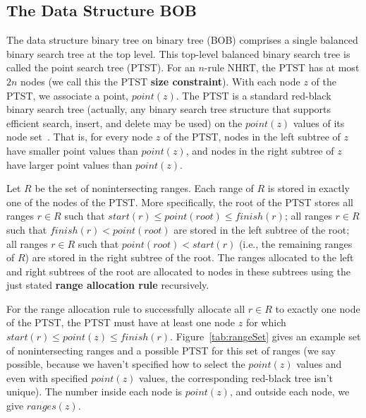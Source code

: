 \subsection{The Data Structure BOB}
The data structure binary tree on binary tree (BOB)
comprises a single balanced binary search tree at the top level.
This top-level balanced binary search tree is called the point search tree
(PTST). For an $n$-rule NHRT, the PTST has at most $2n$ nodes (we call this
the PTST {\bf size constraint}).
With each node $z$ of the PTST, we associate a point, $point(z)$.
The PTST is a standard red-black binary search tree (actually, any
binary search tree structure that supports efficient search, insert, and delete
may be used) on the $point(z)$ values of its node
set~\cite{horo1}. That is, for every node $z$ of the PTST, nodes in
the left subtree of $z$ have smaller point values than $point(z)$, and
nodes in the right subtree of $z$ have larger point values than $point(z)$.

Let $R$ be the set of nonintersecting ranges. Each range of $R$
is stored in exactly one of the nodes of the PTST. More specifically, the root
of the PTST stores all ranges $r \in R$ such that $start(r) \leq point(root)
\leq finish(r)$; all ranges $r \in R$ such that $finish(r) < point(root)$ are
stored in the left subtree of the root; all ranges $r \in R$ such
that $point(root) < start(r)$ (i.e., the remaining ranges of $R$)
are stored in the right subtree of the root.
The ranges allocated to the left and right subtrees of the root are allocated
to nodes in these subtrees using the just stated {\bf range allocation rule}
recursively.

For the range allocation rule to successfully allocate all $r \in R$ to
exactly one node of the PTST, the PTST must have at least one node $z$ for
which $start(r) \leq point(z) \leq finish(r)$. Figure~\ref{tab:rangeSet}
gives an example set of nonintersecting ranges and
a possible PTST for this set of ranges (we say
possible, because we haven't specified how to select the $point(z)$ values
and even with specified $point(z)$ values, the corresponding red-black tree
isn't unique). The number inside each node is $point(z)$, and outside each
node, we give $ranges(z)$.


